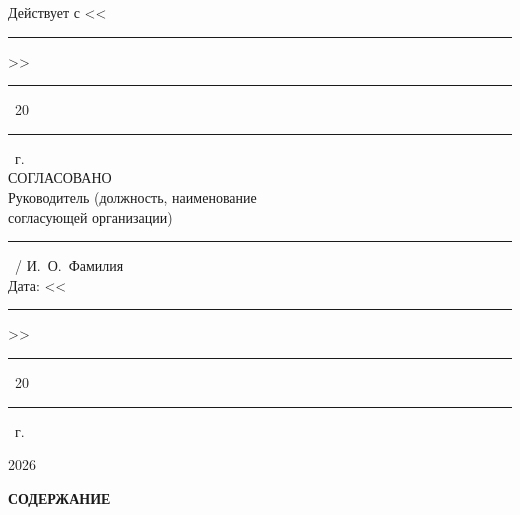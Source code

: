 {\vspace{1.8em}

\noindent
Действует с <<\rule{1cm}{0.4pt}>>~\rule{3cm}{0.4pt}~20\rule{0.7cm}{0.4pt}~г.\\[0.6em]
СОГЛАСОВАНО\\
Руководитель (должность, наименование\\
согласующей организации)\\[1em]
\rule{3cm}{0.4pt}~/ И.~О.~Фамилия\\[0.3em]
Дата: <<\rule{1cm}{0.4pt}>>~\rule{2.4cm}{0.4pt}~20\rule{0.7cm}{0.4pt}~г.

\vspace{1.8em}
\begin{center}2026\end{center}

} %

\clearpage
\begin{center}{\fontsize{14pt}{21pt}\selectfont\bfseries СОДЕРЖАНИЕ}\end{center}
\vspace{0.5em}

